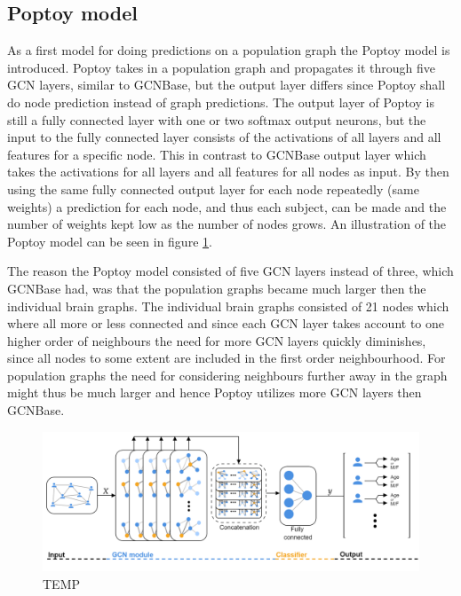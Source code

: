 \subsection{Poptoy model}
As a first model for doing predictions on a population graph the Poptoy model is introduced. Poptoy takes in a population graph and propagates it through five GCN layers, similar to GCNBase, but the output layer differs since Poptoy shall do node prediction instead of graph predictions. The output layer of Poptoy is still a fully connected layer with one or two softmax output neurons, but the input to the fully connected layer consists of the activations of all layers and all features for a specific node. This in contrast to GCNBase output layer which takes the activations for all layers and all features for all nodes as input. By then using the same fully connected output layer for each node repeatedly (same weights) a prediction for each node, and thus each subject, can be made and the number of weights kept low as the number of nodes grows. An illustration of the Poptoy model can be seen in figure \ref{fig:poptoy}.

The reason the Poptoy model consisted of five GCN layers instead of three, which GCNBase had, was that the population graphs became much larger then the individual brain graphs. The individual brain graphs consisted of 21 nodes which where all more or less connected and since each GCN layer takes account to one higher order of neighbours the need for more GCN layers quickly diminishes, since all nodes to some extent are included in the first order neighbourhood. For population graphs the need for considering neighbours further away in the graph might thus be much larger and hence Poptoy utilizes more GCN layers then GCNBase. 

\begin{figure}[H]
    \centering
    \includegraphics[width=\textwidth]{chapters/images_methods/poptoy_v2.png}
    \caption{TEMP}
    \label{fig:poptoy}
\end{figure}

